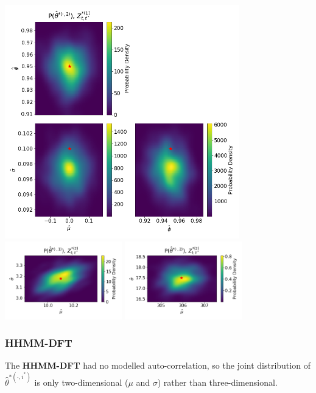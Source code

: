 \documentclass[12pt]{TD-CJS}
\begin{document}
\includegraphics[height=4in]{../Plots/hmm_FV_MLE_density_A_0_1.png}
\includegraphics[width=2in]{../Plots/hmm_FV_MLE_density_FoVeDBA_0_0.png}
\includegraphics[width=2in]{../Plots/hmm_FV_MLE_density_FoVeDBA_0_1.png}


\newpage
\subsubsection{\textbf{HHMM-DFT}}

The \textbf{HHMM-DFT} had no modelled auto-correlation, so the joint distribution of $\hat \theta^{*(\cdot,i^*)}$ is only two-dimensional ($\mu$ and $\sigma$) rather than three-dimensional.
\end{document}
